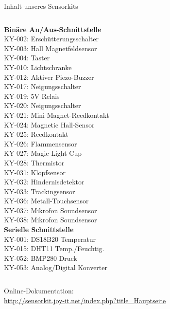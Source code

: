 {\begin{frame}{Inhalt unseres Sensorkits}
\begin{columns}[onlytextwidth]
        \textbf{Binäre An/Aus-Schnittstelle} \\
        KY-002: Erschütterungsschalter \\
        KY-003: Hall Magnetfeldsensor \\
        KY-004: Taster \\
        KY-010: Lichtschranke \\
        KY-012: Aktiver Piezo-Buzzer \\
        KY-017: Neigungsschalter \\
        KY-019: 5V Relais \\
        KY-020: Neigungsschalter \\
        KY-021: Mini Magnet-Reedkontakt \\
        KY-024: Magnetic Hall-Sensor \\
        KY-025: Reedkontakt \\
        KY-026: Flammensensor \\
        KY-027: Magic Light Cup \\
        KY-028: Thermistor \\
        KY-031: Klopfsensor \\
        KY-032: Hindernisdetektor \\
        KY-033: Trackingsensor \\
        KY-036: Metall-Touchsensor \\
        KY-037: Mikrofon Soundsensor \\
        KY-038: Mikrofon Soundsensor \\

        \textbf{Serielle Schnittstelle} \\
        KY-001: DS18B20 Temperatur \\
        KY-015: DHT11 Temp./Feuchtig. \\
        KY-052: BMP280 Druck \\
        KY-053: Analog/Digital Konverter \\
    \end{columns}

    \bigskip
    {
        \footnotesize
        Online-Dokumentation: \\
        \url{http://sensorkit.joy-it.net/index.php?title=Hauptseite}
    }
\end{frame}
}

